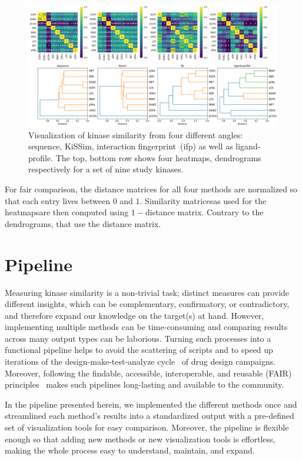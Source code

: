 \documentclass[9pt,training,ASAPversion]{livecoms}
\begin{document}
\begin{figure}
    \centering
    \includegraphics[width=\textwidth]{all_comparison.png}
    \caption{Visualization of kinase similarity from four different angles: sequence, KiSSim, interaction fingerprint~(ifp) as well as ligand-profile. The top, bottom row shows four heatmaps, dendrograms respectively for a set of nine study kinases.}
    \label{fig:comparison}
\end{figure}

For fair comparison, the distance matrices for all four methods are normalized so that each entry lives between $0$ and $1$. Similarity matrices\textemdash as used for the heatmaps\textemdash are then computed using $1-$distance matrix. Contrary to the dendrograms, that use the distance matrix.

\section{Pipeline}
Measuring kinase similarity is a non-trivial task; distinct measures can provide different insights, which can be complementary, confirmatory, or contradictory, and therefore expand our knowledge on the target(s) at hand. 
However, implementing multiple methods can be time-consuming and comparing results across many output types can be laborious.
Turning such processes into a functional pipeline helps to avoid the scattering of scripts and to speed up iterations of the design-make-test-analyze cycle~\cite{Schneider_2019_NatRevDrugDiscov} of drug design campaigns. Moreover, following the findable, accessible,
interoperable, and reusable (FAIR) principles~\cite{Wilkinson_2016_SciData} makes such pipelines long-lasting and available to the community.

In the pipeline presented herein, we implemented the different methods once and streamlined each method's results into a standardized output with a pre-defined set of visualization tools for easy comparison. Moreover, the pipeline is flexible enough so that adding new methods or new visualization tools is effortless, making the whole process easy to understand, maintain, and expand.
\end{document}
